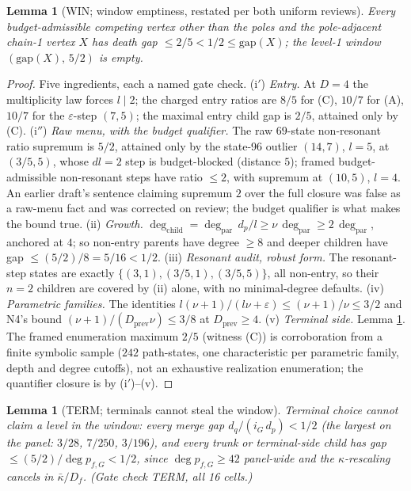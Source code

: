 \documentclass[11pt]{article}
\newtheorem{lemma}[theorem]{Lemma}
\theoremstyle{definition}
\theoremstyle{remark}
\newcommand{\kb}{\bar\kappa}
\begin{document}
\begin{lemma}[WIN; window emptiness, restated per both uniform reviews]\label{lem:WIN}
Every budget-admissible competing vertex other than the poles and the pole-adjacent chain-1 vertex $X$ has death gap $\leq2/5<1/2\leq\mathrm{gap}(X)$; the level-1 window $(\mathrm{gap}(X),\,5/2)$ is empty.
\end{lemma}

\begin{proof}
Five ingredients, each a named gate check.
(i$'$) \emph{Entry.} At $D=4$ the multiplicity law forces $l\mid2$; the charged entry ratios are $8/5$ for (C), $10/7$ for (A), $10/7$ for the $\varepsilon$-step $(7,5)$; the maximal entry child gap is $2/5$, attained only by (C).
(i$''$) \emph{Raw menu, with the budget qualifier.} The raw $69$-state non-resonant ratio supremum is $5/2$, attained only by the state-96 outlier $(14,7)$, $l=5$, at $(3/5,5)$, whose $dl=2$ step is budget-blocked (distance $5$); framed budget-admissible non-resonant steps have ratio $\leq2$, with supremum at $(10,5)$, $l=4$. An earlier draft's sentence claiming supremum $2$ over the full closure was false as a raw-menu fact and was corrected on review; the budget qualifier is what makes the bound true.
(ii) \emph{Growth.} $\deg_{\mathrm{child}}=\deg_{\mathrm{par}}\,d_p/l\geq\nu\,\deg_{\mathrm{par}}\geq2\,\deg_{\mathrm{par}}$, anchored at $4$; so non-entry parents have degree $\geq8$ and deeper children have gap $\leq(5/2)/8=5/16<1/2$.
(iii) \emph{Resonant audit, robust form.} The resonant-step states are exactly $\{(3,1),(3/5,1),(3/5,5)\}$, all non-entry, so their $n=2$ children are covered by (ii) alone, with no minimal-degree defaults.
(iv) \emph{Parametric families.} The identities $l(\nu+1)/(l\nu+\varepsilon)\leq(\nu+1)/\nu\leq3/2$ and N4's bound $(\nu+1)/(D_{\mathrm{prev}}\nu)\leq3/8$ at $D_{\mathrm{prev}}\geq4$.
(v) \emph{Terminal side.} Lemma \ref{lem:TERM}.
The framed enumeration maximum $2/5$ (witness (C)) is corroboration from a finite symbolic sample ($242$ path-states, one characteristic per parametric family, depth and degree cutoffs), not an exhaustive realization enumeration; the quantifier closure is by (i$'$)--(v).
\end{proof}

\begin{lemma}[TERM; terminals cannot steal the window]\label{lem:TERM}
Terminal choice cannot claim a level in the window: every merge gap $d_q/(i_G\,d_p)<1/2$ (the largest on the panel: $3/28$, $7/250$, $3/196$), and every trunk or terminal-side child has gap $\leq(5/2)/\deg p_{f,G}<1/2$, since $\deg p_{f,G}\geq42$ panel-wide and the $\kappa$-rescaling cancels in $\kb/D_f$. (Gate check TERM, all 16 cells.)
\end{lemma}
\end{document}
